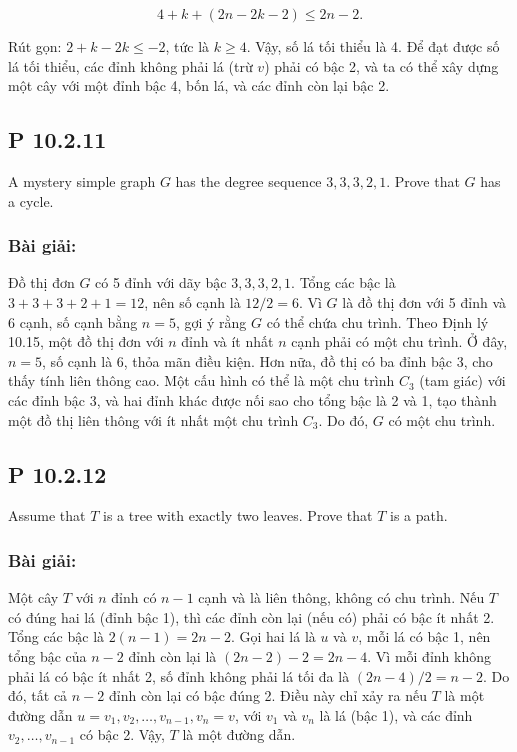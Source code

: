 \documentclass[a4paper,12pt]{article}
\begin{document}
\[
4 + k + (2n - 2k - 2) \leq 2n - 2.
\]

Rút gọn: \( 2 + k - 2k \leq -2 \), tức là \( k \geq 4 \). Vậy, số lá tối thiểu là 4. Để đạt được số lá tối thiểu, các đỉnh không phải lá (trừ \( v \)) phải có bậc 2, và ta có thể xây dựng một cây với một đỉnh bậc 4, bốn lá, và các đỉnh còn lại bậc 2.

\subsection*{P 10.2.11}
A mystery simple graph \( G \) has the degree sequence \( 3, 3, 3, 2, 1 \). Prove that \( G \) has a cycle.

\subsubsection*{Bài giải:}
Đồ thị đơn \( G \) có 5 đỉnh với dãy bậc \( 3, 3, 3, 2, 1 \). Tổng các bậc là \( 3 + 3 + 3 + 2 + 1 = 12 \), nên số cạnh là \( 12 / 2 = 6 \). Vì \( G \) là đồ thị đơn với 5 đỉnh và 6 cạnh, số cạnh bằng \( n = 5 \), gợi ý rằng \( G \) có thể chứa chu trình. Theo Định lý 10.15, một đồ thị đơn với \( n \) đỉnh và ít nhất \( n \) cạnh phải có một chu trình. Ở đây, \( n = 5 \), số cạnh là 6, thỏa mãn điều kiện. Hơn nữa, đồ thị có ba đỉnh bậc 3, cho thấy tính liên thông cao. Một cấu hình có thể là một chu trình \( C_3 \) (tam giác) với các đỉnh bậc 3, và hai đỉnh khác được nối sao cho tổng bậc là 2 và 1, tạo thành một đồ thị liên thông với ít nhất một chu trình \( C_3 \). Do đó, \( G \) có một chu trình.

\subsection*{P 10.2.12}
Assume that \( T \) is a tree with exactly two leaves. Prove that \( T \) is a path.

\subsubsection*{Bài giải:}
Một cây \( T \) với \( n \) đỉnh có \( n - 1 \) cạnh và là liên thông, không có chu trình. Nếu \( T \) có đúng hai lá (đỉnh bậc 1), thì các đỉnh còn lại (nếu có) phải có bậc ít nhất 2. Tổng các bậc là \( 2(n - 1) = 2n - 2 \). Gọi hai lá là \( u \) và \( v \), mỗi lá có bậc 1, nên tổng bậc của \( n - 2 \) đỉnh còn lại là \( (2n - 2) - 2 = 2n - 4 \). Vì mỗi đỉnh không phải lá có bậc ít nhất 2, số đỉnh không phải lá tối đa là \( (2n - 4) / 2 = n - 2 \). Do đó, tất cả \( n - 2 \) đỉnh còn lại có bậc đúng 2. Điều này chỉ xảy ra nếu \( T \) là một đường dẫn \( u = v_1, v_2, \ldots, v_{n-1}, v_n = v \), với \( v_1 \) và \( v_n \) là lá (bậc 1), và các đỉnh \( v_2, \ldots, v_{n-1} \) có bậc 2. Vậy, \( T \) là một đường dẫn.
\end{document}
